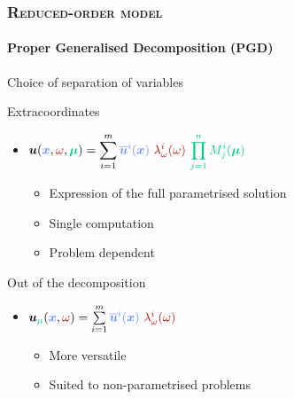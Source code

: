 \documentclass[aspectratio=1610]{beamer}
\begin{document}
	\begin{frame}
		\frametitle{\textsc{Reduced-order model}}
		\framesubtitle{Proper Generalised Decomposition (PGD)}		
		
		\begin{minipage}{0.53\linewidth}
			

			\begin{greenblockshadow}{Choice of separation of variables}
				\begin{overprint}
					\vspace{7pt}
					Extracoordinates {\footnotesize\citeperso{[Chinesta et al., 2011]}}
					\begin{itemize}
						\item \small{$\displaystyle\vect{u}(\textcolor{LightBleuLMPS}{\vect{x}},\textcolor{RougeCEA}{\omega},\textcolor{VertLMPS}{\vect{\mu}}) = \sum\limits_{i=1}^m \textcolor{LightBleuLMPS}{\overline{\vect{u}}^i(\vect{x})} ~\textcolor{RougeCEA}{\lambda^i_{\omega}(\omega)}~\textcolor{VertLMPS}{\prod_{j=1}^{n}M_j^i(\vect{\mu})}$} 
						\begin{itemize}
							\item Expression of the full parametrised solution
							\item Single computation
							\item Problem dependent
						\end{itemize}
					\end{itemize}
					\vspace{8pt}
					Out of the decomposition {\footnotesize\citeperso{[Ladevèze, 1985]}}
					\begin{itemize}
						\item  $\vect{u}_{\textcolor{VertLMPS}{\mu}}(\textcolor{LightBleuLMPS}{\vect{x}},\textcolor{RougeCEA}{\omega}) = \sum\limits_{i=1}^m \textcolor{LightBleuLMPS}{\overline{\vect{u}}^i(\vect{x})} ~\textcolor{RougeCEA}{\lambda^i_{\omega}(\omega)}$ 
						\begin{itemize}
							\item More versatile {\footnotesize\citeperso{[Scanff et al., 2022]}}
							\item Suited to non-parametrised problems
						\end{itemize}
					\end{itemize}
				\end{overprint}
			\end{greenblockshadow}
			
			
			

\end{minipage}
\end{frame}
\end{document}
